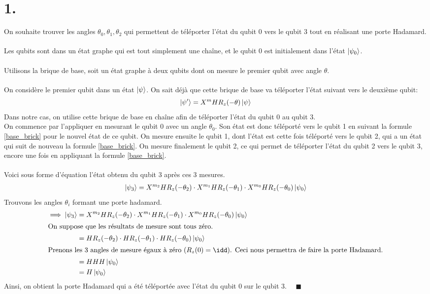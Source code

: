 \documentclass{article}
\begin{document}

\newpage

\section*{1.}
On souhaite trouver les angles $\theta_0, \theta_1, \theta_2$ qui permettent de téléporter l'état du qubit 0 vers le qubit 3 tout en réalisant une porte Hadamard. 
\\\\
Les qubits sont dans un état graphe qui est tout simplement une chaîne, et le qubit 0 est initialement dans l'état $\ket{\psi_0}$.
\\\\
Utilisons la brique de base, soit un état graphe à deux qubits dont on mesure le premier qubit avec angle $\theta$.
\\\\
On considère le premier qubit dans un état $\ket{\psi}$. On sait déjà que cette brique de base va téléporter l'état suivant vers le deuxième qubit:
\begin{equation}
    \ket{\psi'} = X^mHR_z(-\theta)\ket{\psi} \label{base_brick}
\end{equation}
Dans notre cas, on utilise cette brique de base en chaîne afin de téléporter l'état du qubit 0 au qubit 3. 
\\
On commence par l'appliquer en mesurant le qubit 0 avec un angle $\theta_0$. Son état est donc téléporté vers le qubit 1 en suivant la formule \ref{base_brick} pour le nouvel état de ce qubit. On mesure ensuite le qubit 1, dont l'état est cette fois téléporté vers le qubit 2, qui a un état qui suit de nouveau la formule \ref{base_brick}. On mesure finalement le qubit 2, ce qui permet de téléporter l'état du qubit 2 vers le qubit 3, encore une fois en appliquant la formule \ref{base_brick}.
\\\\
Voici sous forme d'équation l'état obtenu du qubit 3 après ces 3 mesures. 
\begin{align*}
    \ket{\psi_3} = X^{m_2}HR_z(-\theta_2)\cdot X^{m_1}HR_z(-\theta_1)\cdot X^{m_0}HR_z(-\theta_0)\ket{\psi_0}    
\end{align*}
Trouvons les angles $\theta_i$ formant une porte hadamard.
\begin{align*}
    \implies \ket{\psi_3} &= X^{m_2}HR_z(-\theta_2)\cdot X^{m_1}HR_z(-\theta_1)\cdot X^{m_0}HR_z(-\theta_0)\ket{\psi_0}
    \\
    \intertext{On suppose que les résultats de mesure sont tous zéro.}
    &= HR_z(-\theta_2)\cdot HR_z(-\theta_1)\cdot HR_z(-\theta_0)\ket{\psi_0}\\
    \intertext{Prenons les 3 angles de mesure égaux à zéro ($R_z(0)=\idd$). Ceci nous permettra de faire la porte Hadamard.}
    &= H H H\ket{\psi_0}\\
    &= H\ket{\psi_0}
\end{align*}
Ainsi, on obtient la porte Hadamard qui a été téléportée avec l'état du qubit 0 sur le qubit 3. \ \ $\blacksquare$
\end{document}
